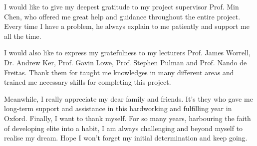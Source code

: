\begin{acknowledgements}
I would like to give my deepest gratitude to my project supervisor Prof. Min Chen, who offered me great help and guidance throughout the entire project. Every time I have a problem, he always explain to me patiently and support me all the time.

I would also like to express my gratefulness to my lecturers Prof. James Worrell, Dr. Andrew Ker, Prof. Gavin Lowe, Prof. Stephen Pulman and Prof. Nando de Freitas. Thank them for taught me knowledges in many different areas and trained me necessary skills for completing this project.

Meanwhile, I really appreciate my dear family and friends. It's they who gave me long-term support and assistance in this hardworking and fulfilling year in Oxford. Finally, I want to thank myself. For so many years, harbouring the faith of developing elite into a habit, I am always challenging and beyond myself to realise my dream. Hope I won't forget my initial determination and keep going.
\end{acknowledgements}